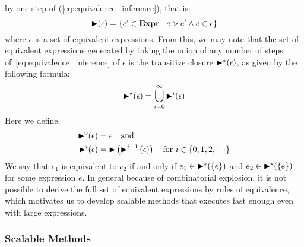 by one step of (\ref{eq:equivalence_inference}), that is:
\begin{equation}
    \operatorname{\blacktriangleright}(\epsilon) = \left\{
        e^\prime\in\mathbf{Expr} \mid
        e \mathbin{\rhd} e^\prime \wedge e\in\epsilon\right\}
\end{equation}
where $\epsilon$ is a set of equivalent expressions. From this, we may note
that the set of equivalent expressions generated by taking the union of any
number of steps of~\eqref{eq:equivalence_inference} of $\epsilon$ is the
transitive closure $\operatorname{\blacktriangleright}^\star(\epsilon)$, as given by the following
formula:
\begin{equation}
    \operatorname{\blacktriangleright}^\star(\epsilon) = \bigcup_{i = 0}^\infty \operatorname{\blacktriangleright}^i(\epsilon)
    \label{eq:transitive_closure}
\end{equation}
Here we define:
\begin{equation}
    \begin{aligned}
        \operatorname{\blacktriangleright}^0(\epsilon) &= \epsilon \quad \text{and~} \\
        \operatorname{\blacktriangleright}^i(\epsilon) &= \operatorname{\blacktriangleright}\left(
            \operatorname{\blacktriangleright}^{i - 1}\left(\epsilon\right)
        \right) \quad \text{for~} i \in \{ 0, 1, 2, \cdots \}
    \end{aligned}
\end{equation}
We say that $e_1$ is equivalent to $e_2$ if and only if $e_1 \in
\operatorname{\blacktriangleright}^\star(\{e\})$ and $e_2 \in \operatorname{\blacktriangleright}^\star(\{e\})$ for some expression
$e$. In general because of combinatorial explosion, it is not possible to
derive the full set of equivalent expressions by rules of equivalence, which
motivates us to develop scalable methods that executes fast enough even with
large expressions.

\subsubsection{Scalable Methods}

